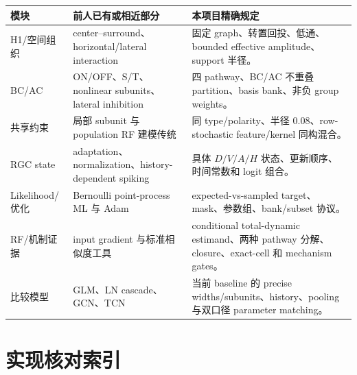 \documentclass[UTF8,12pt,a4paper]{ctexart}
\numberwithin{equation}{section}
\begin{document}
\begin{longtable}{>{\raggedright\arraybackslash}p{}>{\raggedright\arraybackslash}p{}>{\raggedright\arraybackslash}p{}}
\toprule
模块 & 前人已有或相近部分 & 本项目精确规定 \\
\midrule
H1/空间组织 & center--surround、horizontal/lateral interaction\cite{Rodieck1965,CronerKaplan1995,WerblinDowling1969} & 固定 graph、转置回投、低通、bounded effective amplitude、support 半径。\\
BC/AC & ON/OFF、S/T、nonlinear subunits、lateral inhibition\cite{Cleland1971,HochsteinShapley1976,Roska2000,Roska2006} & 四 pathway、BC/AC 不重叠 partition、basis bank、非负 group weights。\\
共享约束 & 局部 subunit 与 population RF 建模传统\cite{HochsteinShapley1976,Pillow2008} & 同 type/polarity、半径 $0.08$、row-stochastic feature/kernel 同构混合。\\
RGC state & adaptation、normalization、history-dependent spiking\cite{ShapleyVictor1978,ChanderChichilnisky2001,Heeger1992,Pillow2005} & 具体 $D/V/A/H$ 状态、更新顺序、时间常数和 logit 组合。\\
Likelihood/优化 & Bernoulli point-process ML 与 Adam\cite{Paninski2004,Pillow2005,KingmaBa2015} & expected-vs-sampled target、mask、参数组、bank/subset 协议。\\
RF/机制证据 & input gradient 与标准相似度工具\cite{Simonyan2013} & conditional total-dynamic estimand、两种 pathway 分解、closure、exact-cell 和 mechanism gates。\\
比较模型 & GLM、LN cascade、GCN、TCN\cite{Pillow2008,KipfWelling2017,Bai2018} & 当前 baseline 的 precise widths/subunits、history、pooling 与双口径 parameter matching。\\
\bottomrule
\end{longtable}

\section{实现核对索引}
\end{document}
